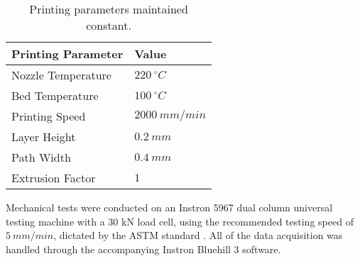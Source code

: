 \documentclass[main.tex]{subfiles}
\begin{document}
\begin{table}[!htbp] 
	\renewcommand{\arraystretch}{1.5}
	\centering
	\caption{Printing parameters maintained constant.}
	\begin{tabular}{C C} 
		\toprule
		\textbf{Printing Parameter} & \textbf{Value}\\
		\midrule
		Nozzle Temperature & $220\ ^\circ C$ \\
		Bed Temperature & $100\ ^\circ C$\\
		Printing Speed & $2000 \  mm/min$\\
		Layer Height & $0.2\  mm$\\
		Path Width & $0.4\  mm$\\
		Extrusion Factor & $1$\\
		\bottomrule
	\end{tabular}
	\label{tab:printparam_ssic}
\end{table}

Mechanical tests were conducted on an Instron 5967 dual column universal testing machine with a 30 kN load cell, using the recommended testing speed of $5\ mm/min$, dictated by the ASTM standard \cite{ASTMD638}. All of the data acquisition was handled through the accompanying Instron Bluehill 3 software. 
\end{document}
